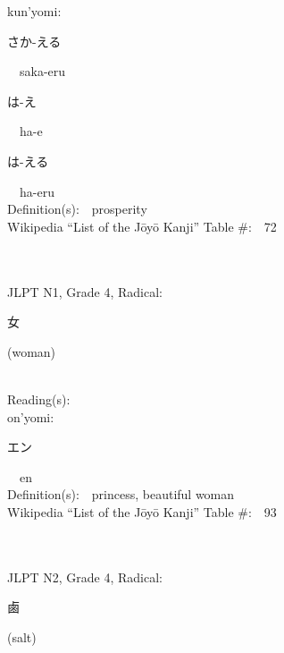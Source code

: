 \begin{multicols}{2}
{\hspace*{1em}}kun'yomi:\ \ \\
{\hspace*{2em}}{\begin{CJK}{UTF8}{min} さか-える \end{CJK}}\ \ saka-eru\ \ \\
{\hspace*{2em}}{\begin{CJK}{UTF8}{min} は-え \end{CJK}}\ \ ha-e\ \ \\
{\hspace*{2em}}{\begin{CJK}{UTF8}{min} は-える \end{CJK}}\ \ ha-eru\ \ \\
Definition(s):\ \ prosperity \\
Wikipedia ``List of the J\=oy\=o Kanji'' Table \#:\ \ 72 \\
\ \ \\
{\fontsize{34pt}{40pt}  }\ \ \\  %
{JLPT N1, Grade 4, Radical:\ \ {\begin{CJK}{UTF8}{min} 女 \end{CJK}} (woman) } \\
Reading(s):\ \ \\
{\hspace*{1em}}on'yomi:\ \ \\
{\hspace*{2em}}{\begin{CJK}{UTF8}{min} エン \end{CJK}}\ \ en\ \ \\
Definition(s):\ \ princess, beautiful woman \\
Wikipedia ``List of the J\=oy\=o Kanji'' Table \#:\ \ 93 \\
\ \ \\
{\fontsize{34pt}{40pt}  }\ \ \\  %
{JLPT N2, Grade 4, Radical:\ \ {\begin{CJK}{UTF8}{min} 鹵 \end{CJK}} (salt) } \\

\end{multicols}
